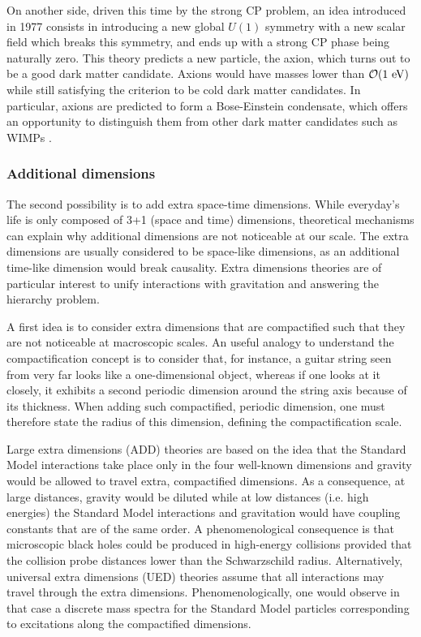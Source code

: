         On another side, driven this time by the strong CP problem,
        an idea introduced in 1977 \cite{PecceiQuinnAxion} consists in introducing a new
        global $U(1)$ symmetry with a new scalar field which breaks this symmetry, and
        ends up with a strong CP phase being naturally zero. This theory predicts a new
        particle, the axion, which turns out to be a good dark matter candidate.
        Axions would have masses lower than $\mathcal{O}(1~\text{eV})$ while still satisfying
        the criterion to be cold dark matter candidates. In particular, axions are predicted to
        form a Bose-Einstein condensate, which offers an opportunity to distinguish them
        from other dark matter candidates such as WIMPs \cite{AxionBoseEinstein}.

        \subsubsection{Additional dimensions}

        The second possibility is to add extra space-time dimensions. While everyday's life
        is only composed of 3+1 (space and time) dimensions, theoretical mechanisms can
        explain why additional dimensions are not noticeable at our scale.
        The extra dimensions are usually considered to be space-like dimensions, as an
        additional time-like dimension would break causality. Extra dimensions theories
        are of particular interest to unify interactions with gravitation and answering
        the hierarchy problem.

        A first idea is to consider extra dimensions that are compactified such that they
        are not noticeable at macroscopic scales. An useful analogy to understand the
        compactification concept is to consider that, for instance, a guitar string
        seen from very far looks like a one-dimensional object, whereas if one looks at it
        closely, it exhibits a second periodic dimension around the string axis because of its
        thickness. When adding such compactified, periodic dimension, one must therefore
        state the radius of this dimension, defining the compactification scale.

        Large extra dimensions (ADD) \cite{ADD} theories are based on the idea that the
        Standard Model interactions take place only in the four well-known dimensions and
        gravity would be allowed to travel extra, compactified dimensions. As a consequence,
        at large distances, gravity would be diluted while at low distances (i.e. high
        energies) the Standard Model interactions and gravitation would have coupling
        constants that are of the same order. A phenomenological consequence is that microscopic
        black holes could
        be produced in high-energy collisions provided that the collision probe distances
        lower than the Schwarzschild radius. Alternatively, universal extra dimensions
        (UED) \cite{UED} theories assume that all interactions may travel through the extra
        dimensions. Phenomenologically, one would observe in that case a discrete mass
        spectra for the Standard Model particles corresponding to excitations along the
        compactified dimensions.

